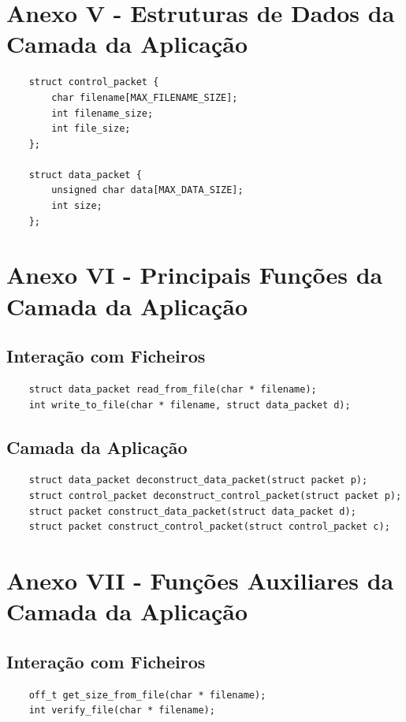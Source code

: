 \documentclass[article, a4paper, 11pt, oneside]{memoir}
\begin{document}
\section{Anexo V - Estruturas de Dados da Camada da Aplicação}

\begin{lstlisting}
    struct control_packet {
        char filename[MAX_FILENAME_SIZE];
        int filename_size;
        int file_size;
    };

    struct data_packet {
        unsigned char data[MAX_DATA_SIZE];
        int size;
    };
\end{lstlisting}

\section{Anexo VI - Principais Funções da Camada da Aplicação}

\subsection{Interação com Ficheiros}
\begin{lstlisting}
    struct data_packet read_from_file(char * filename);
    int write_to_file(char * filename, struct data_packet d);
\end{lstlisting}
\subsection{Camada da Aplicação}
\begin{lstlisting}
    struct data_packet deconstruct_data_packet(struct packet p);
    struct control_packet deconstruct_control_packet(struct packet p);
    struct packet construct_data_packet(struct data_packet d);
    struct packet construct_control_packet(struct control_packet c);
\end{lstlisting}


\section{Anexo VII - Funções Auxiliares da Camada da Aplicação}

\subsection{Interação com Ficheiros}
\begin{lstlisting}
    off_t get_size_from_file(char * filename);
    int verify_file(char * filename);
\end{lstlisting}
\end{document}
